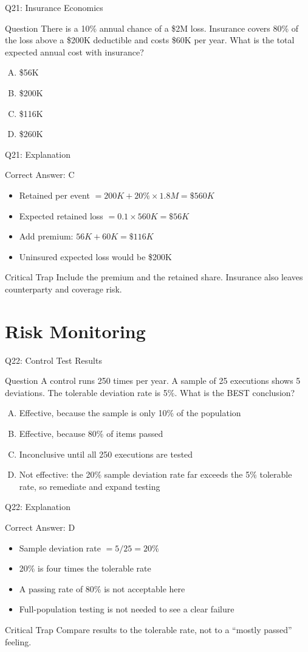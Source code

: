 \documentclass[aspectratio=169]{beamer}
\newcommand{\hq}[7]{%
  \begin{frame}{Q#1: #2}
    \begin{block}{Question}
      #3
    \end{block}
    \begin{enumerate}[(A)]
      #4
    \end{enumerate}
  \end{frame}
  \begin{frame}{Q#1: Explanation}
    \begin{block}{Correct Answer: #5}
      \begin{itemize}
        #6
      \end{itemize}
    \end{block}
    \begin{alertblock}{Critical Trap}
      #7
    \end{alertblock}
  \end{frame}
}
\begin{document}
\hq{21}{Insurance Economics}
{There is a 10\% annual chance of a \$2M loss. Insurance covers 80\% of the loss above a \$200K deductible and costs \$60K per year. What is the total expected annual cost with insurance?}
{\item \$56K
 \item \$200K
 \item \$116K
 \item \$260K}
{C}
{\item Retained per event $= 200K + 20\% \times 1.8M = \$560K$
 \item Expected retained loss $= 0.1 \times 560K = \$56K$
 \item Add premium: $56K + 60K = \$116K$
 \item Uninsured expected loss would be \$200K}
{Include the premium and the retained share. Insurance also leaves counterparty and coverage risk.}

\section{Risk Monitoring}

\hq{22}{Control Test Results}
{A control runs 250 times per year. A sample of 25 executions shows 5 deviations. The tolerable deviation rate is 5\%. What is the BEST conclusion?}
{\item Effective, because the sample is only 10\% of the population
 \item Effective, because 80\% of items passed
 \item Inconclusive until all 250 executions are tested
 \item Not effective: the 20\% sample deviation rate far exceeds the 5\% tolerable rate, so remediate and expand testing}
{D}
{\item Sample deviation rate $= 5/25 = 20\%$
 \item 20\% is four times the tolerable rate
 \item A passing rate of 80\% is not acceptable here
 \item Full-population testing is not needed to see a clear failure}
{Compare results to the tolerable rate, not to a ``mostly passed'' feeling.}
\end{document}
